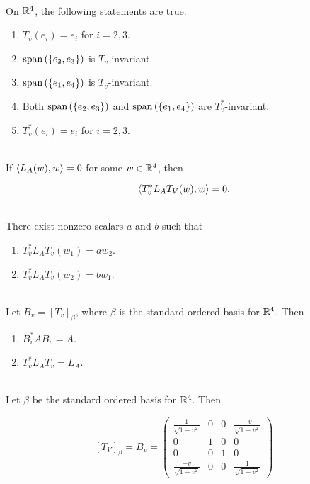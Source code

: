 \begin{theorem}
	\hfill\\
	On $\mathbb{R}^4$, the following statements are true.

	\begin{enumerate}
		\item $T_v(e_i) = e_i$ for $i = 2,3$.
		\item $\text{span}\left(\{e_2, e_3\}\right)$ is $T_v$-invariant.
		\item $\text{span}\left(\{e_1, e_4\}\right)$ is $T_v$-invariant.
		\item Both $\text{span}\left(\{e_2, e_3\}\right)$ and $\text{span}\left(\{e_1, e_4\}\right)$ are $T_v^*$-invariant.
		\item $T_v^*(e_i) = e_i$ for $i=2,3$.
	\end{enumerate}
\end{theorem}

\begin{theorem}
	\hfill\\
	If $\langle L_A(w),w\rangle = 0$ for some $w \in \mathbb{R}^4$, then

	\[\langle T_v^*L_AT_V(w), w\rangle = 0.\]
\end{theorem}

\begin{theorem}
	\hfill\\
	There exist nonzero scalars $a$ and $b$ such that

	\begin{enumerate}
		\item $T_v^*L_AT_v(w_1) = aw_2$.
		\item $T_v^*L_AT_v(w_2) = bw_1$.
	\end{enumerate}
\end{theorem}

\begin{corollary}
	\hfill\\
	Let $B_v = [T_v]_\beta$, where $\beta$ is the standard ordered basis for $\mathbb{R}^4$. Then

	\begin{enumerate}
		\item $B_v^*AB_v = A$.
		\item $T_v^*L_AT_v = L_A$.
	\end{enumerate}
\end{corollary}

\begin{theorem}
	\hfill\\
	Let $\beta$ be the standard ordered basis for $\mathbb{R}^4$. Then

	\[[T_V]_\beta = B_v = \begin{pmatrix}
			\frac{1}{\sqrt{1 - v^2}}  & 0 & 0 & \frac{-v}{\sqrt{1 - v^2}} \\
			0                         & 1 & 0 & 0                         \\
			0                         & 0 & 1 & 0                         \\
			\frac{-v}{\sqrt{1 - v^2}} & 0 & 0 & \frac{1}{\sqrt{1 - v^2}}
		\end{pmatrix}\]
\end{theorem}
